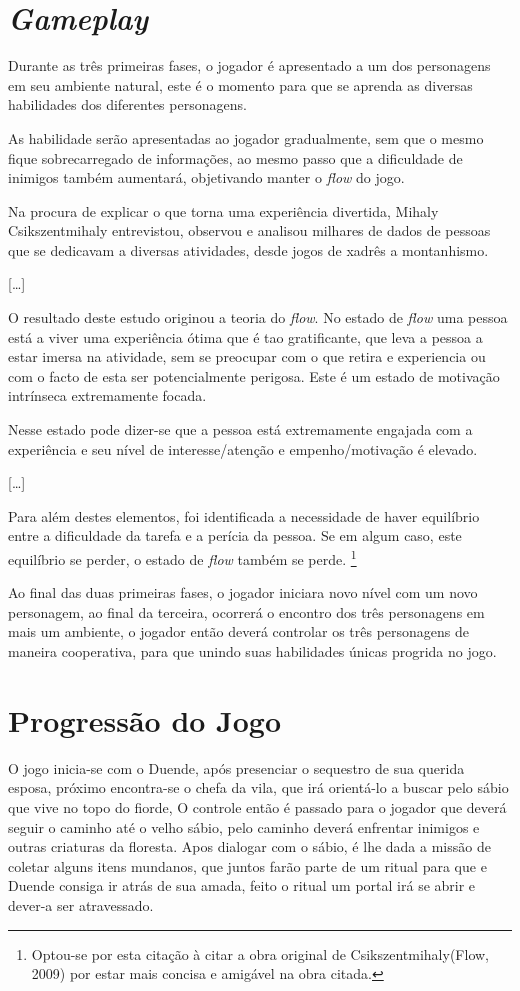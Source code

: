 \section{\textit{Gameplay}}

Durante as três primeiras fases, o jogador é apresentado a um dos personagens em seu ambiente natural, este é o momento para que se aprenda as diversas habilidades dos diferentes personagens.

As habilidade serão apresentadas ao jogador gradualmente, sem que o mesmo fique sobrecarregado de informações, ao mesmo passo que a dificuldade de inimigos também aumentará, objetivando manter o \textit{flow} do jogo.
\begin{citacao}
Na procura de explicar o que torna uma experiência divertida, Mihaly Csikszentmihaly entrevistou, observou e analisou milhares de dados de pessoas que se dedicavam a diversas atividades, desde jogos de xadrês a montanhismo.

[\ldots]

O resultado deste estudo originou a teoria do \textit{flow}. No estado de \textit{flow} uma pessoa está a viver uma experiência ótima que é tao gratificante, que leva a pessoa a estar imersa na atividade, sem se preocupar com o que retira e experiencia ou com o facto de esta ser potencialmente perigosa. Este é um estado de motivação intrínseca extremamente focada. 

Nesse estado pode dizer-se que a pessoa está extremamente engajada com a experiência e seu nível de interesse/atenção e empenho/motivação é elevado. 

[\ldots]

Para além destes elementos, foi identificada a necessidade de haver equilíbrio entre a dificuldade da tarefa e a perícia da pessoa. Se em algum caso, este equilíbrio se perder, o estado de \textit{flow} também se perde. \cite{pradadesign}\footnote{Optou-se por esta citação à citar a obra original de Csikszentmihaly(Flow, 2009) por estar mais concisa e amigável na obra citada.}

\end{citacao}

Ao final das duas primeiras fases, o jogador iniciara novo nível com um novo personagem, ao final da terceira, ocorrerá o encontro dos três personagens em mais um ambiente, o jogador então deverá controlar os três personagens de maneira cooperativa, para que unindo suas habilidades únicas progrida no jogo.


\section{Progressão do Jogo}
O jogo inicia-se com o Duende, após presenciar o sequestro de sua querida esposa, próximo encontra-se o chefa da vila, que irá orientá-lo a buscar pelo sábio que vive no topo do fiorde, O controle então é passado para o jogador que deverá seguir o caminho até o velho sábio, pelo caminho deverá enfrentar inimigos e outras criaturas da floresta. Apos dialogar com o sábio, é lhe dada a missão de coletar alguns itens mundanos, que juntos farão parte de um ritual para que e Duende consiga ir atrás de sua amada, feito o ritual um portal irá se abrir e dever-a ser atravessado.

